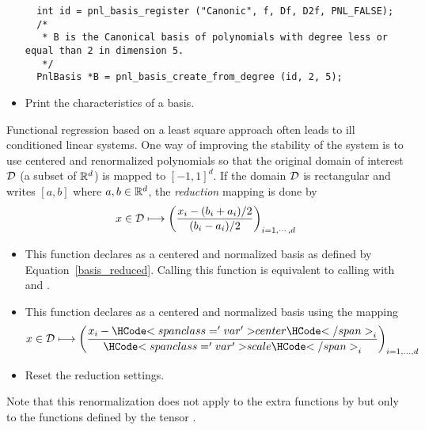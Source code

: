 \begin{itemize}
\begin{lstlisting}
  int id = pnl_basis_register ("Canonic", f, Df, D2f, PNL_FALSE);
  /*
   * B is the Canonical basis of polynomials with degree less or equal than 2 in dimension 5.
   */
  PnlBasis *B = pnl_basis_create_from_degree (id, 2, 5);
  \end{lstlisting}

\item {}
  \sshortdescribe Print the characteristics of a basis.

\end{itemize}


Functional regression based on a least square approach often leads to ill conditioned linear systems. One way of improving the stability of the system is to use centered and renormalized polynomials so that the original domain of interest ${\mathcal D}$ (a subset of ${\mathbb R}^d$) is mapped to $[-1,1]^d$. If the domain ${\mathcal D}$ is rectangular and writes $[a, b]$ where $a,b \in {\mathbb R}^d$, the \emph{reduction} mapping is done by 
\begin{equation}
  \label{basis_reduced}
  x \in {\mathcal D} \longmapsto \left(\frac{x_i - (b_i+a_i)/2}{(b_i - a_i)/2}
  \right)_{i=1,\cdots,d}
\end{equation}
\begin{itemize}
\item {}
  \sshortdescribe This function declares  as a centered and normalized basis
  as defined by Equation~\ref{basis_reduced}. Calling this function is equivalent to
  calling  with  and
  .
\item {}
  \sshortdescribe This function declares  as a centered and normalized basis using the mapping
  \begin{equation*}
    x \in \cD \longmapsto \left(\frac{x_i - \var{center}_i }{\var{scale}_i}
    \right)_{i=1,\dots,d}
  \end{equation*}
\item {}
  \sshortdescribe Reset the reduction settings.
\end{itemize}
Note that this renormalization does not apply to the extra functions by  but only to the functions defined by the tensor .

